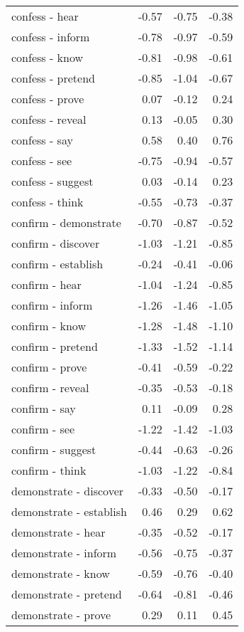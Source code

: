 \begin{longtable}{lrrr}
  confess - hear & -0.57 & -0.75 & -0.38 \\ 
  confess - inform & -0.78 & -0.97 & -0.59 \\ 
  confess - know & -0.81 & -0.98 & -0.61 \\ 
  confess - pretend & -0.85 & -1.04 & -0.67 \\ 
  confess - prove & 0.07 & -0.12 & 0.24 \\ 
  confess - reveal & 0.13 & -0.05 & 0.30 \\ 
  confess - say & 0.58 & 0.40 & 0.76 \\ 
  confess - see & -0.75 & -0.94 & -0.57 \\ 
  confess - suggest & 0.03 & -0.14 & 0.23 \\ 
  confess - think & -0.55 & -0.73 & -0.37 \\ 
  confirm - demonstrate & -0.70 & -0.87 & -0.52 \\ 
  confirm - discover & -1.03 & -1.21 & -0.85 \\ 
  confirm - establish & -0.24 & -0.41 & -0.06 \\ 
  confirm - hear & -1.04 & -1.24 & -0.85 \\ 
  confirm - inform & -1.26 & -1.46 & -1.05 \\ 
  confirm - know & -1.28 & -1.48 & -1.10 \\ 
  confirm - pretend & -1.33 & -1.52 & -1.14 \\ 
  confirm - prove & -0.41 & -0.59 & -0.22 \\ 
  confirm - reveal & -0.35 & -0.53 & -0.18 \\ 
  confirm - say & 0.11 & -0.09 & 0.28 \\ 
  confirm - see & -1.22 & -1.42 & -1.03 \\ 
  confirm - suggest & -0.44 & -0.63 & -0.26 \\ 
  confirm - think & -1.03 & -1.22 & -0.84 \\ 
  demonstrate - discover & -0.33 & -0.50 & -0.17 \\ 
  demonstrate - establish & 0.46 & 0.29 & 0.62 \\ 
  demonstrate - hear & -0.35 & -0.52 & -0.17 \\ 
  demonstrate - inform & -0.56 & -0.75 & -0.37 \\ 
  demonstrate - know & -0.59 & -0.76 & -0.40 \\ 
  demonstrate - pretend & -0.64 & -0.81 & -0.46 \\ 
  demonstrate - prove & 0.29 & 0.11 & 0.45 \\ 

\end{longtable}
